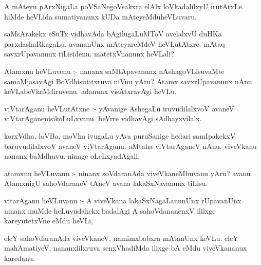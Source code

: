 \documentclass{article}
\begin{document}
\begin{mn}
A mAteyu pArxNigaLa poVSaNegoVsakxra elAlx loVkadalilxyU irutAtxLe. hiMde
 heVLida sumatiyanunx kUDa mAteyeMduheVLuvaru. 
\end{mn}

\begin{mn}
saMsArakekx eSuTx vidhavAda bAgilugaLuMToV avelalxvU duHKa parxdashaRkagaLu.
 avananUnx mAteyareMdeV heVLutAtxre. mAtaq savxrUpavanunx tiLisidenu.  
 matetxVnanunx heVLali?
\end{mn}

\begin{mn}
Atamxnu heVLuvenu :- nananx saMtApavanunx nAshagoVLisuvaMte samaMjasavAgi 
 BoVdhisutitxruva niVnu yAru? Atamx  savxrUpavanunx  nAnu keVLabeVkeMdiruvenu.  
adanunx visAtxravAgi heVLu.
\end{mn}

\begin{mn}
viVtarAganu heVLutAtxne :- yAvanige AshegaLu iruvudilalxvoV avaneV 
viVtarAganenisikoLuLxvanu. beVrre  vidhavAgi sAdhayxvilalx.
\end{mn}

\begin{mn}
korxVdha, loVBa, moVha ivugaLu yAva puruSanige hedari samIpakekxV baruvudilalxvoV 
avaneV viVtarAganu.  aMtaha viVtarAganeV nAnu.  viveVkanu nananx baMdhuvu. 
ninage oLeLxyadAgali. 
\end{mn}

\begin{mn}
atamxnu heVLuvanu :- ninanx soVdaranAda viveVkaneMbuvanu yAru? avanu AtamxnigU 
sahoVdaraneV tAneV  avana lakaSxNavanunx tiLisu.
\end{mn}

\begin{mn}
vitarAganu heVLuvanu :- A viveVkana lakaSxNagaLanunUnx rUpavanUnx ninanx 
muMde heLuvudakekx badalAgi A sahoVdananenxV  ililxge kareyutetxVne eMdu heVLi, 
\end{mn}

\begin{mn}
eleY sahoVdaranAda viveVkaneV, namimxbabxra mAtanUnx keVLu. eleY mahAmatiyeV,
 nananxlilxruva senxVhadiMda ilixge bA eMdu viveVkananux karedanu.
\end{mn}
\end{document}
